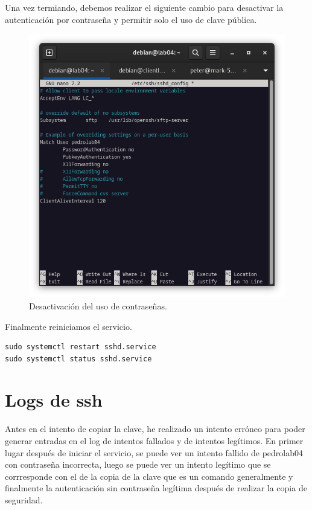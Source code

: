 Una vez termiando, debemos realizar el siguiente cambio para desactivar la autenticación por contraseña y permitir solo el uso de clave pública.

\begin{figure}[H]
	\centering
	\includegraphics[scale=0.40]{09}
	\caption{Desactivación del uso de contraseñas.}
\end{figure}

Finalmente reiniciamos el servicio.

\begin{lstlisting}[style=mybash]
sudo systemctl restart sshd.service
sudo systemctl status sshd.service
\end{lstlisting}

\newpage
\section{Logs de ssh}

Antes en el intento de copiar la clave, he realizado un intento erróneo para poder generar entradas en el log de intentos fallados y de intentos legítimos. En primer lugar después de iniciar el servicio, se puede ver un intento fallido de pedrolab04 con contraseña incorrecta, luego se puede ver un intento legítimo que se corrresponde con el de la copia de la clave que es un comando generalmente y finalmente la autenticación sin contraseña legítima después de realizar la copia de seguridad.

